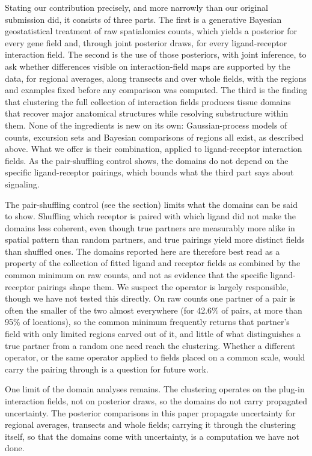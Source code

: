 \documentclass[10pt,letterpaper]{article}
\begin{document}
Stating our contribution precisely, and more narrowly than our original submission did, it consists of three parts. The first is a generative Bayesian geostatistical treatment of raw spatialomics counts, which yields a posterior for every gene field and, through joint posterior draws, for every ligand-receptor interaction field. The second is the use of those posteriors, with joint inference, to ask whether differences visible on interaction-field maps are supported by the data, for regional averages, along transects and over whole fields, with the regions and examples fixed before any comparison was computed. The third is the finding that clustering the full collection of interaction fields produces tissue domains that recover major anatomical structures while resolving substructure within them. None of the ingredients is new on its own: Gaussian-process models of counts, excursion sets and Bayesian comparisons of regions all exist, as described above. What we offer is their combination, applied to ligand-receptor interaction fields. As the pair-shuffling control shows, the domains do not depend on the specific ligand-receptor pairings, which bounds what the third part says about signaling.

The pair-shuffling control (see the  section) limits what the domains can be said to show. Shuffling which receptor is paired with which ligand did not make the domains less coherent, even though true partners are measurably more alike in spatial pattern than random partners, and true pairings yield more distinct fields than shuffled ones. The domains reported here are therefore best read as a property of the collection of fitted ligand and receptor fields as combined by the common minimum on raw counts, and not as evidence that the specific ligand-receptor pairings shape them. We suspect the operator is largely responsible, though we have not tested this directly. On raw counts one partner of a pair is often the smaller of the two almost everywhere (for 42.6\% of pairs, at more than 95\% of locations), so the common minimum frequently returns that partner's field with only limited regions carved out of it, and little of what distinguishes a true partner from a random one need reach the clustering. Whether a different operator, or the same operator applied to fields placed on a common scale, would carry the pairing through is a question for future work.

One limit of the domain analyses remains. The clustering operates on the plug-in interaction fields, not on posterior draws, so the domains do not carry propagated uncertainty. The posterior comparisons in this paper propagate uncertainty for regional averages, transects and whole fields; carrying it through the clustering itself, so that the domains come with uncertainty, is a computation we have not done.
\end{document}
